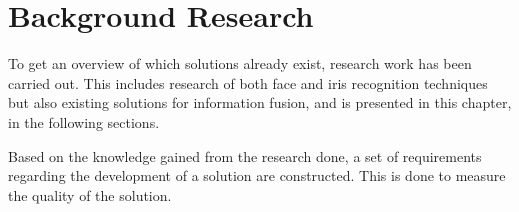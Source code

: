 \chapter{Background Research}
\label{cha:Research}
To get an overview of which solutions already exist, research work has been carried out. This includes research of both face and iris recognition techniques but also existing solutions for information fusion, and is presented in this chapter, in the following sections.




Based on the knowledge gained from the research done, a set of requirements regarding the development of a solution are constructed. This is done to measure the quality of the solution.